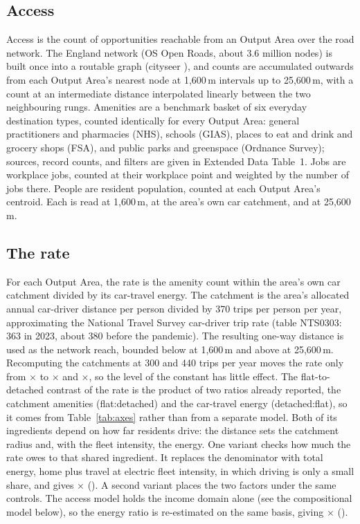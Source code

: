 \documentclass[pdflatex,sn-nature]{sn-jnl}
\begin{document}
\subsection*{Access}

Access is the count of opportunities reachable from an Output Area over the road network. The England network (OS Open Roads, about 3.6 million nodes) is built once into a routable graph (cityseer \citep{simons2023}), and counts are accumulated outwards from each Output Area's nearest node at 1,600\,m intervals up to 25,600\,m, with a count at an intermediate distance interpolated linearly between the two neighbouring rungs. Amenities are a benchmark basket of six everyday destination types, counted identically for every Output Area: general practitioners and pharmacies (NHS), schools (GIAS), places to eat and drink and grocery shops (FSA), and public parks and greenspace (Ordnance Survey); sources, record counts, and filters are given in Extended Data Table~1. Jobs are workplace jobs, counted at their workplace point and weighted by the number of jobs there. People are resident population, counted at each Output Area's centroid. Each is read at 1,600\,m, at the area's own car catchment, and at 25,600\,m.

\subsection*{The rate}

For each Output Area, the rate is the amenity count within the area's own car catchment divided by its car-travel energy. The catchment is the area's allocated annual car-driver distance per person divided by 370 trips per person per year, approximating the National Travel Survey car-driver trip rate (table NTS0303: 363 in 2023, about 380 before the pandemic). The resulting one-way distance is used as the network reach, bounded below at 1,600\,m and above at 25,600\,m. Recomputing the catchments at 300 and 440 trips per year moves the rate only from \nepitripMidRate$\times$ to \nepitripLowRate$\times$ and \nepitripHighRate$\times$, so the level of the constant has little effect. The flat-to-detached contrast of the rate is the product of two ratios already reported, the catchment amenities (flat:detached) and the car-travel energy (detached:flat), so it comes from Table~\ref{tab:axes} rather than from a separate model. Both of its ingredients depend on how far residents drive: the distance sets the catchment radius and, with the fleet intensity, the energy. One variant checks how much the rate owes to that shared ingredient. It replaces the denominator with total energy, home plus travel at electric fleet intensity, in which driving is only a small share, and gives \nepirateCirc$\times$ (\nepirateCircCI). A second variant places the two factors under the same controls. The access model holds the income domain alone (see the compositional model below), so the energy ratio is re-estimated on the same basis, giving \nepirateHarm$\times$ (\nepirateHarmCI).
\end{document}
